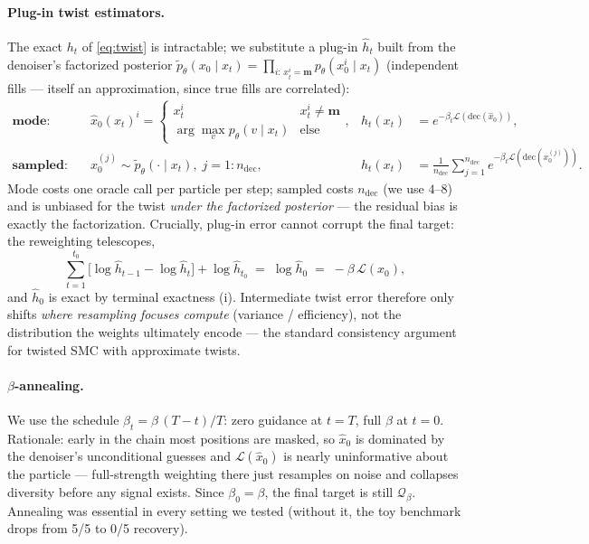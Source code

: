 \documentclass[11pt]{article}
\newcommand{\Ploss}{\mathcal{L}}
\newcommand{\xhat}{\hat{x}_0}
\newcommand{\dec}{\mathrm{dec}}
\newcommand{\mask}{\mathbf{m}}
\begin{document}
\paragraph{Plug-in twist estimators.} The exact $h_t$ of \eqref{eq:twist}
is intractable; we substitute a plug-in $\hat h_t$ built from the
denoiser's factorized posterior
$\tilde p_\theta(x_0 \mid x_t) = \prod_{i:\, x_t^i = \mask}
p_\theta(x_0^i \mid x_t)$ (independent fills --- itself an approximation,
since true fills are correlated):
\begin{align}
\textbf{mode:}\quad
& \xhat(x_t)^i =
\begin{cases}
x_t^i & x_t^i \neq \mask\\
\arg\max_v p_\theta(v \mid x_t) & \text{else}
\end{cases},
& \hat h_t(x_t) &= e^{-\beta_t \Ploss(\dec(\xhat))},
\\[2pt]
\textbf{sampled:}\quad
& x_0^{(j)} \sim \tilde p_\theta(\cdot \mid x_t),\; j = 1{:}n_{\mathrm{dec}},
& \hat h_t(x_t) &= \frac{1}{n_{\mathrm{dec}}}
\sum_{j=1}^{n_{\mathrm{dec}}} e^{-\beta_t \Ploss(\dec(x_0^{(j)}))}.
\end{align}
Mode costs one oracle call per particle per step; sampled costs
$n_{\mathrm{dec}}$ (we use $4$--$8$) and is unbiased for the twist
\emph{under the factorized posterior} --- the residual bias is exactly the
factorization. Crucially, plug-in error cannot corrupt the final target:
the reweighting telescopes,
\begin{equation}
\sum_{t=1}^{t_0} \big[ \log \hat h_{t-1} - \log \hat h_t \big]
+ \log \hat h_{t_0}
\;=\; \log \hat h_0 \;=\; -\beta\, \Ploss(x_0),
\end{equation}
and $\hat h_0$ is exact by terminal exactness (i). Intermediate twist error
therefore only shifts \emph{where resampling focuses compute} (variance /
efficiency), not the distribution the weights ultimately encode --- the
standard consistency argument for twisted SMC with approximate twists.

\paragraph{$\beta$-annealing.} We use the schedule
$\beta_t = \beta\,(T - t)/T$: zero guidance at $t{=}T$, full $\beta$ at
$t{=}0$. Rationale: early in the chain most positions are masked, so
$\xhat$ is dominated by the denoiser's unconditional guesses and
$\Ploss(\xhat)$ is nearly uninformative about the particle --- full-strength
weighting there just resamples on noise and collapses diversity before any
signal exists. Since $\beta_0 = \beta$, the final target is still
$\mathcal{Q}_\beta$. Annealing was essential in every setting we tested
(without it, the toy benchmark drops from 5/5 to 0/5 recovery).
\end{document}
